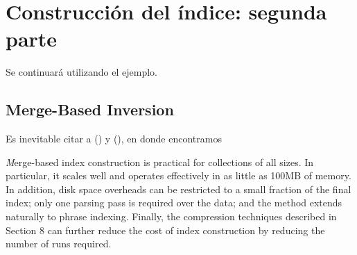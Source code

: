 \section{Construcción del índice: segunda parte}

Se continuará utilizando el ejemplo.

\subsection{Merge-Based Inversion}

Es inevitable citar a \citet[p. ~14]{Zobel06invertedfiles} (\citeyear{Zobel06invertedfiles}) y \citet[p.~238]{WittenMoffatBell99} (\citeyear{WittenMoffatBell99}), en donde encontramos

\textit Merge-based index construction is practical for collections of all sizes. In particular,
it scales well and operates effectively in as little as 100MB of memory. In addition, disk
space overheads can be restricted to a small fraction of the final index; only one parsing
pass is required over the data; and the method extends naturally to phrase indexing.
Finally, the compression techniques described in Section 8 can further reduce the cost
of index construction by reducing the number of runs required.




